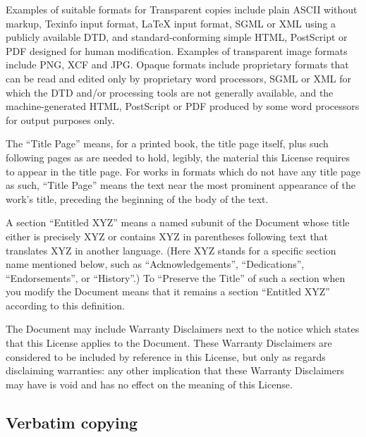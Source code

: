 {\tiny{}Examples of suitable formats for Transparent copies include
plain ASCII without markup, Texinfo input format, \LaTeX{} input format,
SGML or XML using a publicly available DTD, and standard-conforming
simple HTML, PostScript or PDF designed for human modification. Examples
of transparent image formats include PNG, XCF and JPG. Opaque formats
include proprietary formats that can be read and edited only by proprietary
word processors, SGML or XML for which the DTD and/or processing tools
are not generally available, and the machine-generated HTML, PostScript
or PDF produced by some word processors for output purposes only.}{\tiny\par}

{\tiny{}The ``Title Page'' means, for a printed book, the title
page itself, plus such following pages as are needed to hold, legibly,
the material this License requires to appear in the title page. For
works in formats which do not have any title page as such, \textquotedblleft Title
Page\textquotedblright{} means the text near the most prominent appearance
of the work's title, preceding the beginning of the body of the text.}{\tiny\par}

{\tiny{}A section ``Entitled XYZ'' means a named subunit of the
Document whose title either is precisely XYZ or contains XYZ in parentheses
following text that translates XYZ in another language. (Here XYZ
stands for a specific section name mentioned below, such as \textquotedblleft Acknowledgements\textquotedblright ,
\textquotedblleft Dedications\textquotedblright , \textquotedblleft Endorsements\textquotedblright ,
or \textquotedblleft History\textquotedblright .) To \textquotedblleft Preserve
the Title\textquotedblright{} of such a section when you modify the
Document means that it remains a section \textquotedblleft Entitled
XYZ\textquotedblright{} according to this definition.}{\tiny\par}

{\tiny{}The Document may include Warranty Disclaimers next to the
notice which states that this License applies to the Document. These
Warranty Disclaimers are considered to be included by reference in
this License, but only as regards disclaiming warranties: any other
implication that these Warranty Disclaimers may have is void and has
no effect on the meaning of this License.}{\tiny\par}

\subsection{Verbatim copying\label{subsec:2Verbatim-copying}}

